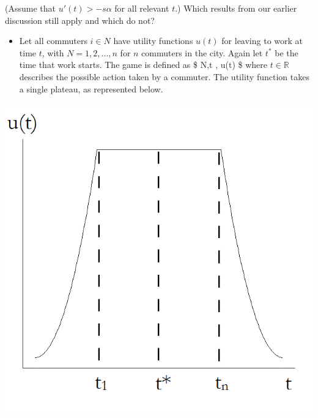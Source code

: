 \documentclass[]{article}
\providecommand{\tightlist}{%
  \setlength{\itemsep}{0pt}\setlength{\parskip}{0pt}}
\begin{document}
(Assume that \(u'(t) > -s\alpha\) for all relevant \(t\).) Which results
from our earlier discussion still apply and which do not?

\begin{itemize}
\tightlist
\item
  Let all commuters \(i \in N\) have utility functions \(u(t)\) for
  leaving to work at time \(t\), with \(N = {1,2,...,n}\) for \(n\)
  commuters in the city. Again let \(t^*\) be the time that work starts.
  The game is defined as \$ \langle N,t \in {}, u(t) \rangle\$
  where \(t \in \mathbb{R}\) describes the possible action taken by a
  commuter. The utility function takes a single plateau, as represented
  below.
\end{itemize}

\begin{center} 
    \includegraphics[scale=0.5]{ut.png}
\end{center}
\end{document}
